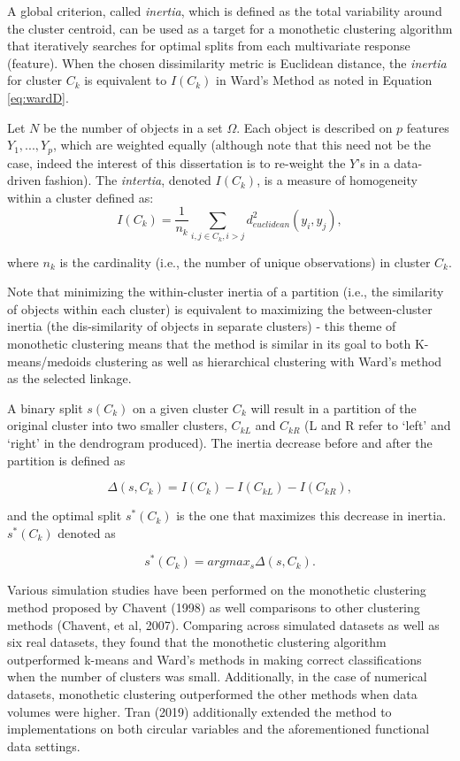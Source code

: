 \documentclass[
]{article}
\begin{document}
A global criterion, called \textit{inertia}, which is defined as the
total variability around the cluster centroid, can be used as a target
for a monothetic clustering algorithm that iteratively searches for
optimal splits from each multivariate response (feature). When the
chosen dissimilarity metric is Euclidean distance, the \textit{inertia}
for cluster \(C_k\) is equivalent to \(I(C_k)\) in Ward's Method as
noted in Equation \ref{eq:wardD}.

Let \(N\) be the number of objects in a set \(\Omega\). Each object is
described on \(p\) features \(Y_1,..., Y_p\), which are weighted equally
(although note that this need not be the case, indeed the interest of
this dissertation is to re-weight the \(Y\)'s in a data-driven fashion).
The \textit{intertia}, denoted \(I(C_k)\), is a measure of homogeneity
within a cluster defined as: \begin{equation}
    I(C_k) = \frac{1}{n_k}\sum_{i,j \in C_k, i>j} d^2_{euclidean}(y_i, y_j), 
\end{equation}

where \(n_k\) is the cardinality (i.e., the number of unique
observations) in cluster \(C_k\).

Note that minimizing the within-cluster inertia of a partition (i.e.,
the similarity of objects within each cluster) is equivalent to
maximizing the between-cluster inertia (the dis-similarity of objects in
separate clusters) - this theme of monothetic clustering means that the
method is similar in its goal to both K-means/medoids clustering as well
as hierarchical clustering with Ward's method as the selected linkage.

A binary split \(s(C_k)\) on a given cluster \(C_k\) will result in a
partition of the original cluster into two smaller clusters, \(C_{kL}\)
and \(C_{kR}\) (L and R refer to `left' and `right' in the dendrogram
produced). The inertia decrease before and after the partition is
defined as

\begin{equation}
    \Delta(s,C_k) = I(C_k) - I(C_{kL}) - I(C_{kR}),
\end{equation}

and the optimal split \(s^*(C_k)\) is the one that maximizes this
decrease in inertia. \(s^*(C_k)\) denoted as

\begin{equation}
    s^*(C_k) = argmax_{s} \Delta(s,C_k).
\end{equation}

Various simulation studies have been performed on the monothetic
clustering method proposed by Chavent (1998) as well comparisons to
other clustering methods (Chavent, et al, 2007). Comparing across
simulated datasets as well as six real datasets, they found that the
monothetic clustering algorithm outperformed k-means and Ward's methods
in making correct classifications when the number of clusters was small.
Additionally, in the case of numerical datasets, monothetic clustering
outperformed the other methods when data volumes were higher. Tran
(2019) additionally extended the method to implementations on both
circular variables and the aforementioned functional data settings.
\end{document}
